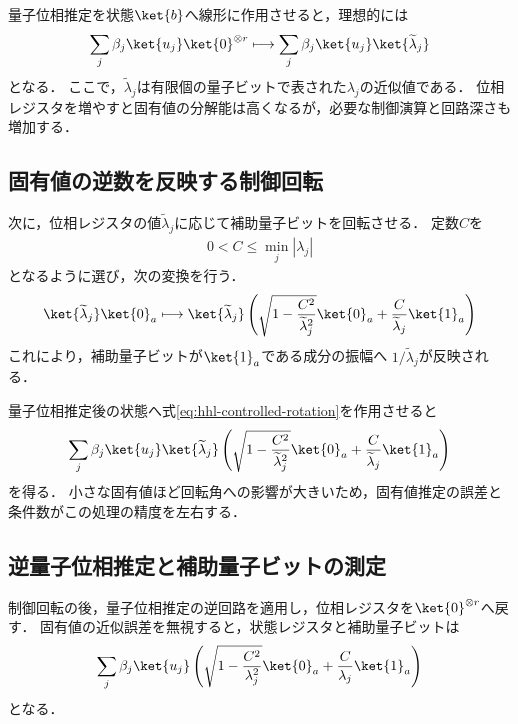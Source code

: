 量子位相推定を状態$\ket{b}$へ線形に作用させると，理想的には
\begin{equation}
  \sum_j\beta_j\ket{u_j}\ket{0}^{\otimes r}
  \longmapsto
  \sum_j\beta_j\ket{u_j}\ket{\widetilde{\lambda}_j}
  \label{eq:hhl-phase-estimation}
\end{equation}
となる．
ここで，$\widetilde{\lambda}_j$は有限個の量子ビットで表された$\lambda_j$の近似値である．
位相レジスタを増やすと固有値の分解能は高くなるが，必要な制御演算と回路深さも増加する．

\subsection{固有値の逆数を反映する制御回転}
\label{subsec:hhl-controlled-rotation}

次に，位相レジスタの値$\widetilde{\lambda}_j$に応じて補助量子ビットを回転させる．
定数$C$を
\begin{align*}
  0<C\leq\min_j|\lambda_j|
\end{align*}
となるように選び，次の変換を行う．
\begin{equation}
  \ket{\widetilde{\lambda}_j}\ket{0}_{a}
  \longmapsto
  \ket{\widetilde{\lambda}_j}
  \left(
    \sqrt{1-\frac{C^2}{\widetilde{\lambda}_j^2}}\ket{0}_{a}
    +\frac{C}{\widetilde{\lambda}_j}\ket{1}_{a}
  \right)
  \label{eq:hhl-controlled-rotation}
\end{equation}
これにより，補助量子ビットが$\ket{1}_{a}$である成分の振幅へ
$1/\widetilde{\lambda}_j$が反映される．

量子位相推定後の状態へ式\eqref{eq:hhl-controlled-rotation}を作用させると
\begin{align*}
  \sum_j\beta_j\ket{u_j}\ket{\widetilde{\lambda}_j}
  \left(
    \sqrt{1-\frac{C^2}{\widetilde{\lambda}_j^2}}\ket{0}_{a}
    +\frac{C}{\widetilde{\lambda}_j}\ket{1}_{a}
  \right)
\end{align*}
を得る．
小さな固有値ほど回転角への影響が大きいため，固有値推定の誤差と条件数がこの処理の精度を左右する．

\subsection{逆量子位相推定と補助量子ビットの測定}
\label{subsec:hhl-uncomputation-and-measurement}

制御回転の後，量子位相推定の逆回路を適用し，位相レジスタを$\ket{0}^{\otimes r}$へ戻す．
固有値の近似誤差を無視すると，状態レジスタと補助量子ビットは
\begin{align*}
  \sum_j\beta_j\ket{u_j}
  \left(
    \sqrt{1-\frac{C^2}{\lambda_j^2}}\ket{0}_{a}
    +\frac{C}{\lambda_j}\ket{1}_{a}
  \right)
\end{align*}
となる．

